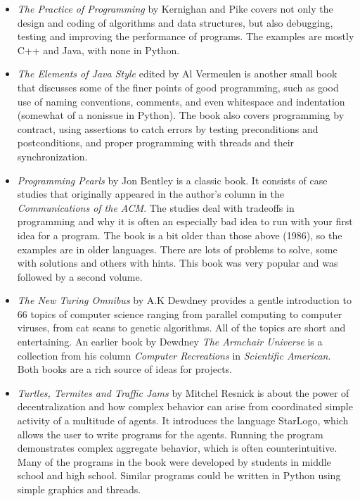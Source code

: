 \begin{itemize}

\item {\em The Practice of Programming} by Kernighan and Pike covers not 
only the design and coding of algorithms and data structures, but also
debugging, testing and improving the performance of programs. The
examples are mostly C++ and Java, with none in Python.

\item {\em The Elements of Java Style} edited by Al Vermeulen is another
small book that discusses some of the finer points of good
programming, such as good use of naming conventions, comments, and
even whitespace and indentation (somewhat of a nonissue in
Python).  The book also covers programming by contract, using
assertions to catch errors by testing preconditions and
postconditions, and proper programming with threads and their
synchronization.

\item {\em Programming Pearls} by Jon Bentley is a classic book.
It consists of case studies that originally appeared in the author's
column in the {\em Communications of the ACM}.  The studies deal with
tradeoffs in programming and why it is often an especially bad idea to
run with your first idea for a program.  The book is a bit older than
those above (1986), so the examples are in older
languages.  There are lots of problems to solve, some with solutions
and others with hints.  This book was very popular and was followed by
a second volume.

\item {\em The New Turing Omnibus} by A.K Dewdney provides a gentle
introduction to 66 topics of computer science ranging from parallel
computing to computer viruses, from cat scans to genetic
algorithms.  All of the topics are short and entertaining.  An earlier
book by Dewdney {\em The Armchair Universe} is a collection from his
column {\em Computer Recreations} in {\em Scientific American}.  Both
books are a rich source of ideas for projects.

\item {\em Turtles, Termites and Traffic Jams} by Mitchel Resnick
is about the power of decentralization and how complex behavior can
arise from coordinated simple activity of a multitude of agents.  It
introduces the language StarLogo, which allows the user to write
programs for the agents.   Running the program
demonstrates complex aggregate behavior, which is often
counterintuitive.  Many of the programs in the book were developed by
students in middle school and high school.  Similar programs could be
written in Python using simple graphics and threads.


\end{itemize}
